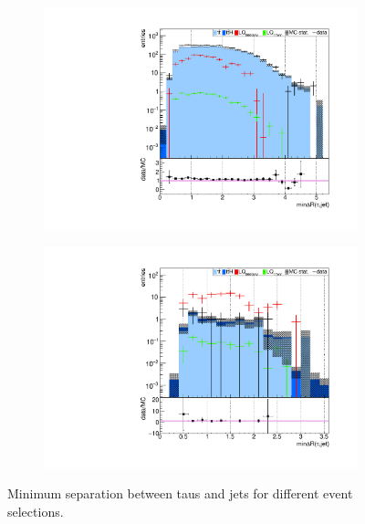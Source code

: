 \begin{figure}
\begin{subfigure}[t]{0.49\textwidth}
                \label{mindR:taujet:2b2tau}
                \end{subfigure}
                \begin{subfigure}[t]{0.49\textwidth}
                \includegraphics[width=\textwidth]{figures/plots/kinLQ75/mindR_taujet_2j1b_1tau.pdf}
                \label{mindR:taujet:1b1tau}
                \end{subfigure}
                \begin{subfigure}[t]{0.49\textwidth}
                \includegraphics[width=\textwidth]{figures/plots/kinLQ75/mindR_taujet_2j1b_2tau.pdf}
                \label{mindR:taujet:1b2tau}
                \end{subfigure}
\caption[Minimum separation between taus and jets for different event selections.]{Minimum separation between taus and jets for different event selections.}
\label{mindR:taujet}
\end{figure}

